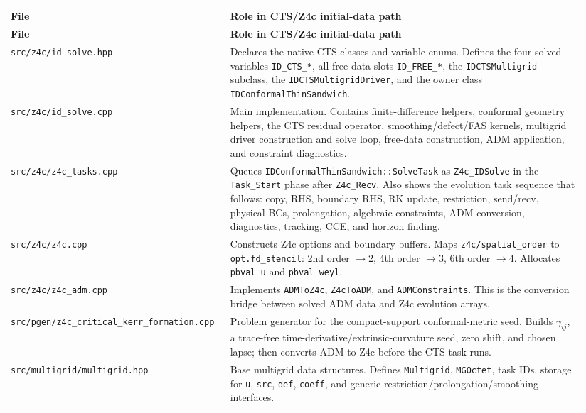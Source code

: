\documentclass[11pt]{article}
\newcommand{\file}[1]{\nolinkurl{#1}}
\newcommand{\code}[1]{\texttt{#1}}
\begin{document}
\begin{longtable}{p{0.34\linewidth} p{0.60\linewidth}}
\toprule
\textbf{File} & \textbf{Role in CTS/Z4c initial-data path} \\
\midrule
\endfirsthead
\toprule
\textbf{File} & \textbf{Role in CTS/Z4c initial-data path} \\
\midrule
\endhead
\file{src/z4c/id\_solve.hpp} &
Declares the native CTS classes and variable enums.  Defines the four solved
variables \code{ID\_CTS\_*}, all free-data slots \code{ID\_FREE\_*}, the
\code{IDCTSMultigrid} subclass, the \code{IDCTSMultigridDriver}, and the owner
class \code{IDConformalThinSandwich}. \\
\addlinespace
\file{src/z4c/id\_solve.cpp} &
Main implementation.  Contains finite-difference helpers, conformal geometry
helpers, the CTS residual operator, smoothing/defect/FAS kernels, multigrid
driver construction and solve loop, free-data construction, ADM application, and
constraint diagnostics. \\
\addlinespace
\file{src/z4c/z4c\_tasks.cpp} &
Queues \code{IDConformalThinSandwich::SolveTask} as \code{Z4c\_IDSolve} in the
\code{Task\_Start} phase after \code{Z4c\_Recv}.  Also shows the evolution task
sequence that follows: copy, RHS, boundary RHS, RK update, restriction, send/recv,
physical BCs, prolongation, algebraic constraints, ADM conversion, diagnostics,
tracking, CCE, and horizon finding. \\
\addlinespace
\file{src/z4c/z4c.cpp} &
Constructs Z4c options and boundary buffers.  Maps \code{z4c/spatial\_order} to
\code{opt.fd\_stencil}: 2nd order \(\to 2\), 4th order \(\to 3\), 6th order
\(\to 4\).  Allocates \code{pbval\_u} and \code{pbval\_weyl}. \\
\addlinespace
\file{src/z4c/z4c\_adm.cpp} &
Implements \code{ADMToZ4c}, \code{Z4cToADM}, and \code{ADMConstraints}.  This is
the conversion bridge between solved ADM data and Z4c evolution arrays. \\
\addlinespace
\file{src/pgen/z4c\_critical\_kerr\_formation.cpp} &
Problem generator for the compact-support conformal-metric seed.  Builds
\(\bar{\gamma}_{ij}\), a trace-free time-derivative/extrinsic-curvature seed,
zero shift, and chosen lapse; then converts ADM to Z4c before the CTS task runs. \\
\addlinespace
\file{src/multigrid/multigrid.hpp} &
Base multigrid data structures.  Defines \code{Multigrid}, \code{MGOctet}, task
IDs, storage for \code{u}, \code{src}, \code{def}, \code{coeff}, and generic
restriction/prolongation/smoothing interfaces. \\

\end{longtable}
\end{document}
